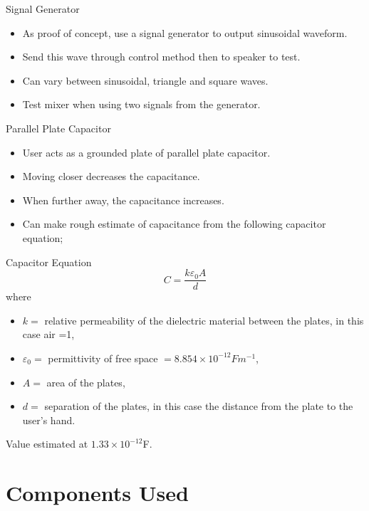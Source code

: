 \documentclass{beamer}
\begin{document}
\begin{frame}{Signal Generator}
	\begin{itemize}
		\item As proof of concept, use a signal generator to output sinusoidal waveform.
		\item Send this wave through control method then to speaker to test.
		\item Can vary between sinusoidal, triangle and square waves.
		\item Test mixer when using two signals from the generator. 
	\end{itemize}
\end{frame}

\begin{frame}{Parallel Plate Capacitor}
	\begin{itemize}
		\item User acts as a grounded plate of parallel plate capacitor.
		\item Moving closer decreases the capacitance.
		\item When further away, the capacitance increases.
		\item Can make rough estimate of capacitance from the following capacitor equation;  
	\end{itemize}
\end{frame}

\begin{frame}{Capacitor Equation}
	\[
		C = \frac{k\varepsilon_0 A}{d}
	\]
	where 
	\begin{itemize}
		\pause \item $k = $ relative permeability of the dielectric material between the plates, in this case air =1,
		\item $\varepsilon_0 = $ permittivity of free space $= 8.854\times 10^{-12}Fm^{-1}$,
		\item $A = $ area of the plates,
		\item $d = $ separation of the plates, in this case the distance from the plate to the user's hand.
	\end{itemize}
 {Value estimated at $1.33\times 10^{-12}$F.}
\end{frame}

\section{Components Used}
\end{document}

